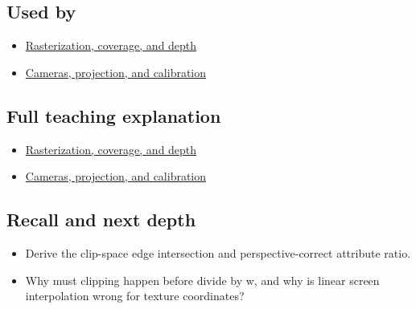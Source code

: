 \subsection{Used by}\label{used-by}

\begin{itemize}
\tightlist
\item
  \href{Continuous\%20Notes/University\%20-\%20Worlds,\%20Images\%20and\%20Inference\%20-\%20Graphics,\%20Vision\%20and\%20Photography\#Rasterization,\%20coverage,\%20and\%20depth}{Rasterization, coverage, and depth}
\item
  \href{Continuous\%20Notes/University\%20-\%20Worlds,\%20Images\%20and\%20Inference\%20-\%20Graphics,\%20Vision\%20and\%20Photography\#Cameras,\%20projection,\%20and\%20calibration}{Cameras, projection, and calibration}
\end{itemize}

\subsection{Full teaching explanation}\label{full-teaching-explanation}

\begin{itemize}
\tightlist
\item
  \href{Continuous\%20Notes/University\%20-\%20Worlds,\%20Images\%20and\%20Inference\%20-\%20Graphics,\%20Vision\%20and\%20Photography\#Rasterization,\%20coverage,\%20and\%20depth}{Rasterization, coverage, and depth}
\item
  \href{Continuous\%20Notes/University\%20-\%20Worlds,\%20Images\%20and\%20Inference\%20-\%20Graphics,\%20Vision\%20and\%20Photography\#Cameras,\%20projection,\%20and\%20calibration}{Cameras, projection, and calibration}
\end{itemize}

\subsection{Recall and next depth}\label{recall-and-next-depth}

\begin{itemize}
\tightlist
\item
  Derive the clip-space edge intersection and perspective-correct attribute ratio.
\item
  Why must clipping happen before divide by w, and why is linear screen interpolation wrong for texture coordinates?
\end{itemize}

